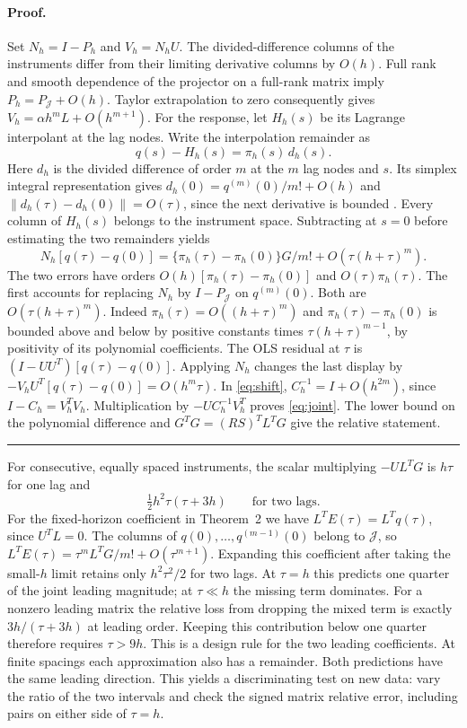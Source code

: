 \paragraph{Proof.}
Set $N_h=I-P_h$ and $V_h=N_h U$. The divided-difference columns of the instruments differ from their limiting derivative columns by $O(h)$. Full rank and smooth dependence of the projector on a full-rank matrix imply $P_h=P_{\mathcal J}+O(h)$. Taylor extrapolation to zero consequently gives $V_h=\alpha h^m L+O(h^{m+1})$. For the response, let $H_h(s)$ be its Lagrange interpolant at the lag nodes. Write the interpolation remainder as
\[
 q(s)-H_h(s)=\pi_h(s)\,d_h(s).
\]
Here $d_h$ is the divided difference of order $m$ at the $m$ lag nodes and $s$. Its simplex integral representation gives $d_h(0)=q^{(m)}(0)/m!+O(h)$ and $\|d_h(\tau)-d_h(0)\|=O(\tau)$, since the next derivative is bounded \cite{deboor}. Every column of $H_h(s)$ belongs to the instrument space. Subtracting at $s=0$ before estimating the two remainders yields
\[
 N_h[q(\tau)-q(0)]
 = \{\pi_h(\tau)-\pi_h(0)\}G/m!+O\!\left(\tau(h+\tau)^m\right).
\]
The two errors have orders $O(h)[\pi_h(\tau)-\pi_h(0)]$ and $O(\tau)\pi_h(\tau)$. The first accounts for replacing $N_h$ by $I-P_{\mathcal J}$ on $q^{(m)}(0)$. Both are $O(\tau(h+\tau)^m)$. Indeed $\pi_h(\tau)=O((h+\tau)^m)$ and $\pi_h(\tau)-\pi_h(0)$ is bounded above and below by positive constants times $\tau(h+\tau)^{m-1}$, by positivity of its polynomial coefficients. The OLS residual at $\tau$ is $(I-UU^T)[q(\tau)-q(0)]$. Applying $N_h$ changes the last display by $-V_hU^T[q(\tau)-q(0)]=O(h^m\tau)$. In \eqref{eq:shift}, $C_h^{-1}=I+O(h^{2m})$, since $I-C_h=V_h^TV_h$. Multiplication by $-UC_h^{-1}V_h^T$ proves \eqref{eq:joint}. The lower bound on the polynomial difference and $G^TG=(RS)^TL^TG$ give the relative statement. \hfill\rule{1ex}{1ex}

For consecutive, equally spaced instruments, the scalar multiplying $-UL^TG$ is $h\tau$ for one lag and
\begin{equation}
 \tfrac12 h^2\tau(\tau+3h)\qquad\text{for two lags}. \label{eq:cross}
\end{equation}
For the fixed-horizon coefficient in Theorem~2 we have $L^TE(\tau)=L^Tq(\tau)$, since $U^TL=0$. The columns of $q(0),\ldots,q^{(m-1)}(0)$ belong to $\mathcal J$, so $L^TE(\tau)=\tau^m L^TG/m!+O(\tau^{m+1})$. Expanding this coefficient after taking the small-$h$ limit retains only $h^2\tau^2/2$ for two lags. At $\tau=h$ this predicts one quarter of the joint leading magnitude; at $\tau\ll h$ the missing term dominates. For a nonzero leading matrix the relative loss from dropping the mixed term is exactly $3h/(\tau+3h)$ at leading order. Keeping this contribution below one quarter therefore requires $\tau>9h$. This is a design rule for the two leading coefficients. At finite spacings each approximation also has a remainder. Both predictions have the same leading direction. This yields a discriminating test on new data: vary the ratio of the two intervals and check the signed matrix relative error, including pairs on either side of $\tau=h$.


